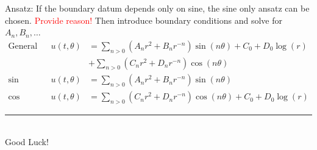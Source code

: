 \documentclass[10pt,landscape]{scrartcl}
\begin{document}
\begin{multicols*}{2}
  Ansatz: If the boundary datum depends only on sine, the sine only ansatz can be chosen. \textcolor{red}{Provide reason!} Then introduce boundary conditions and solve for $A_n,B_n, \dots$
  \begin{align*}
    \text{General} && u(t,\theta) &= \sum_{n>0}\left(A_nr^2+B_nr^{-n}\right)\sin(n\theta) + C_0 + D_0\log(r) \\
                               && &+ \sum_{n>0}\left(C_nr^2+D_nr^{-n}\right)\cos(n\theta) \\
    \text{sin only} && u(t,\theta) &= \sum_{n>0}\left(A_nr^2+B_nr^{-n}\right)\sin(n\theta) \\
    \text{cos only} && u(t,\theta) &= \sum_{n>0}\left(C_nr^2+D_nr^{-n}\right)\cos(n\theta) + C_0 + D_0\log(r)
  \end{align*}


\vspace*{\fill}
\rule{0.3\linewidth}{0.25pt}\\
Good Luck!
%
%
\end{multicols*}
\end{document}
